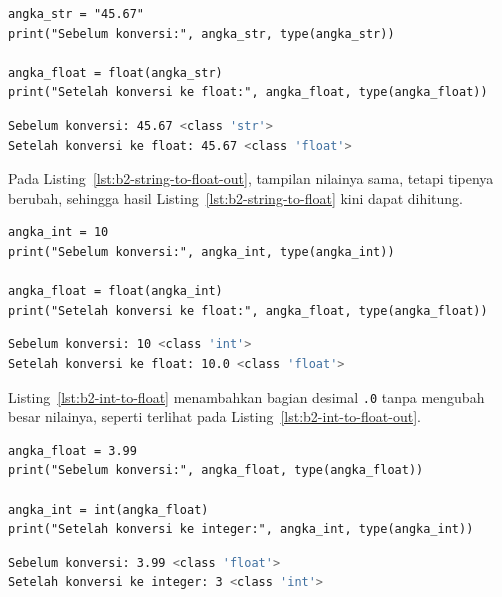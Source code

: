 \begin{lstlisting}[style=PythonStyle, caption={Kode Python: string_to_float.py}, label={lst:b2-string-to-float}]
angka_str = "45.67"
print("Sebelum konversi:", angka_str, type(angka_str))

angka_float = float(angka_str)
print("Setelah konversi ke float:", angka_float, type(angka_float))
\end{lstlisting}

\begin{lstlisting}[language=bash, caption={Keluaran string_to_float.py}, label={lst:b2-string-to-float-out}]
Sebelum konversi: 45.67 <class 'str'>
Setelah konversi ke float: 45.67 <class 'float'>
\end{lstlisting}

Pada Listing~\ref{lst:b2-string-to-float-out}, tampilan nilainya sama, tetapi tipenya berubah, sehingga hasil Listing~\ref{lst:b2-string-to-float} kini dapat dihitung.


\begin{lstlisting}[style=PythonStyle, caption={Kode Python: int_to_float.py}, label={lst:b2-int-to-float}]
angka_int = 10
print("Sebelum konversi:", angka_int, type(angka_int))

angka_float = float(angka_int)
print("Setelah konversi ke float:", angka_float, type(angka_float))
\end{lstlisting}

\begin{lstlisting}[language=bash, caption={Keluaran int_to_float.py}, label={lst:b2-int-to-float-out}]
Sebelum konversi: 10 <class 'int'>
Setelah konversi ke float: 10.0 <class 'float'>
\end{lstlisting}

Listing~\ref{lst:b2-int-to-float} menambahkan bagian desimal \texttt{.0} tanpa mengubah besar nilainya, seperti terlihat pada Listing~\ref{lst:b2-int-to-float-out}.


\begin{lstlisting}[style=PythonStyle, caption={Kode Python: float_to_int.py}, label={lst:b2-float-to-int}]
angka_float = 3.99
print("Sebelum konversi:", angka_float, type(angka_float))

angka_int = int(angka_float)
print("Setelah konversi ke integer:", angka_int, type(angka_int))
\end{lstlisting}

\begin{lstlisting}[language=bash, caption={Keluaran float_to_int.py}, label={lst:b2-float-to-int-out}]
Sebelum konversi: 3.99 <class 'float'>
Setelah konversi ke integer: 3 <class 'int'>
\end{lstlisting}

